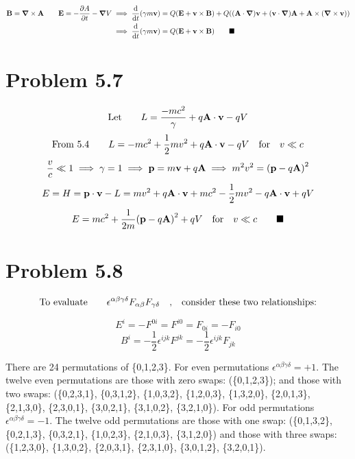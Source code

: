 \documentclass{article}
\begin{document}
\begin{align*}
\vb{B}=\grad\times\vb{A}\qquad\vb{E}=-\pdv{A}{t}-\grad{V}&\implies \dv{t}(\gamma m \vb{v})=Q\qty(\vb{E}+\vb{v}\times\vb{B}) +Q\qty((\vb{A}\cdot\grad)\vb{v}+(\vb{v}\cdot\grad)\vb{A}+\vb{A}\times(\grad\times\vb{v})) \\
&\implies \dv{t}(\gamma m \vb{v})=Q\qty(\vb{E}+\vb{v}\times\vb{B}) \qquad\blacksquare
\end{align*}










\section*{Problem 5.7}

\[
\text{Let}\qquad L=\frac{-mc^2}{\gamma}  +q\vb{A}\cdot \vb{v} -qV
\]
\[
\text{From 5.4}\qquad L=-mc^2 + \frac{1}{2}mv^2  +q\vb{A}\cdot \vb{v} -qV\qq{for} v\ll c
\]
\[
\frac{v}{c}\ll1\implies \gamma=1 \implies \vb{p}=m\vb{v}+q\vb{A} \implies m^2 v^2=\qty(\vb{p}-q\vb{A})^2
\] 
\[
E=H=\vb{p}\cdot\vb{v}-L=mv^2+q\vb{A}\cdot\vb{v}+mc^2 - \frac{1}{2}mv^2  -q\vb{A}\cdot \vb{v} +qV
\]
\[
E=mc^2+\frac{1}{2m}\qty(\vb{p}-q\vb{A})^2+qV\qq{for} v\ll c\qquad\blacksquare
\]

\section*{Problem 5.8}


\[ \text{To evaluate}\qquad \epsilon^{\alpha\beta\gamma\delta}F_{\alpha\beta}F_{\gamma\delta} \qq{,} \text{consider  these  two relationships:}\]



\[ E^{i}=-F^{0i}=F^{i0}=F_{0i}=-F_{i0} \]
\[ B^{i}=-\frac{1}{2} \epsilon^{ijk} F^{jk}=-\frac{1}{2} \epsilon^{ijk} F_{jk} \]

There are 24 permutations of \{0,1,2,3\}. 
For even permutations $\epsilon^{\alpha\beta\gamma\delta}=+1$.
The twelve even permutations are those with zero swaps: (\{0,1,2,3\}); and those with two swaps: (\{0,2,3,1\}, \{0,3,1,2\}, \{1,0,3,2\}, \{1,2,0,3\}, \{1,3,2,0\}, \{2,0,1,3\}, \{2,1,3,0\}, \{2,3,0,1\}, \{3,0,2,1\}, \{3,1,0,2\}, \{3,2,1,0\}).
For odd permutations $\epsilon^{\alpha\beta\gamma\delta}=-1$.
The twelve odd permutations are those with one swap: (\{0,1,3,2\}, \{0,2,1,3\}, \{0,3,2,1\}, \{1,0,2,3\}, \{2,1,0,3\}, \{3,1,2,0\}) and those with three swaps: (\{1,2,3,0\}, \{1,3,0,2\}, \{2,0,3,1\}, \{2,3,1,0\}, \{3,0,1,2\}, \{3,2,0,1\}).
\end{document}

